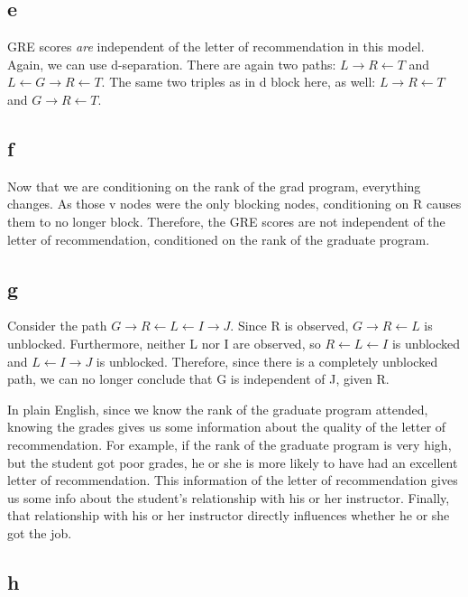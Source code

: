 \documentclass{article}
\begin{document}
\subsection{e}

GRE scores \textit{are} independent of the letter of recommendation in this model. Again, we can use d-separation. 
There are again two paths: $ L \rightarrow R \leftarrow T $ and $ L \leftarrow G \rightarrow R \leftarrow T $. 
The same two triples as in d block here, as well: $ L \rightarrow R \leftarrow T $ and $ G \rightarrow R \leftarrow T $.

\subsection{f}

Now that we are conditioning on the rank of the grad program, everything changes. 
As those v nodes were the only blocking nodes, conditioning on R causes them to 
no longer block. Therefore, the GRE scores are not independent of the letter of 
recommendation, conditioned on the rank of the graduate program.

\subsection{g}

Consider the path $ G \rightarrow R \leftarrow L \leftarrow I \rightarrow J $. 
Since R is observed, $ G \rightarrow R \leftarrow L $ is unblocked. Furthermore, 
neither L nor I are observed, so $ R \leftarrow L \leftarrow I $ is unblocked and 
$ L \leftarrow I \rightarrow J $ is unblocked. Therefore, since there is a 
completely unblocked path, we can no longer conclude that G is independent of J, 
given R.

In plain English, since we know the rank of the graduate program attended, knowing 
the grades gives us some information about the quality of the letter of recommendation. 
For example, if the rank of the graduate program is very high, but the student got 
poor grades, he or she is more likely to have had an excellent letter of recommendation.
This information of the letter of recommendation gives us some info about the student's 
relationship with his or her instructor. Finally, that relationship with his or 
her instructor directly influences whether he or she got the job.

\subsection{h}
\end{document}

